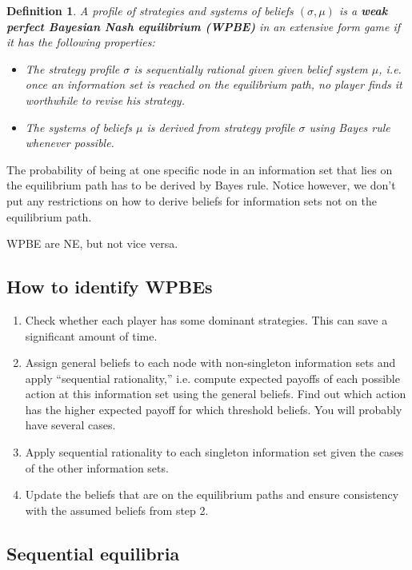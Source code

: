 \documentclass[letter, 10pt]{article}
\newtheorem{definition}{Definition}[section]
\begin{document}
\begin{spacing}{1.1}
\begin{definition}
  A profile of strategies and systems of beliefs $(\sigma, \mu)$ is a
  \textbf{weak perfect Bayesian Nash equilibrium (WPBE)} in an extensive
  form game if it has the following properties:
  \begin{itemize}
  \item The strategy profile $\sigma$ is sequentially rational given given
    belief system $\mu$, i.e. once an information set is reached on the
    equilibrium path, no player finds it worthwhile to revise his strategy.
  \item The systems of beliefs $\mu$ is derived from strategy profile
    $\sigma$ using Bayes rule whenever possible.
  \end{itemize}
\end{definition}

The probability of being at one specific node in an information set that
lies on the equilibrium path has to be derived by Bayes rule. Notice
however, we don't put any restrictions on how to derive beliefs for
information sets not on the equilibrium path.

WPBE are NE, but not vice versa.

\subsection{How to identify WPBEs}

\begin{enumerate}
\item Check whether each player has some dominant strategies. This can save
  a significant amount of time.
\item Assign general beliefs to each node with non-singleton information
  sets and apply ``sequential rationality,'' i.e. compute expected payoffs
  of each possible action at this information set using the general
  beliefs. Find out which action has the higher expected payoff for which
  threshold beliefs. You will probably have several cases.
\item Apply sequential rationality to each singleton information set given
  the cases of the other information sets.
\item Update the beliefs that are on the equilibrium paths and ensure
  consistency with the assumed beliefs from step 2.
\end{enumerate}

\subsection{Sequential equilibria}


\end{spacing}
\end{document}
